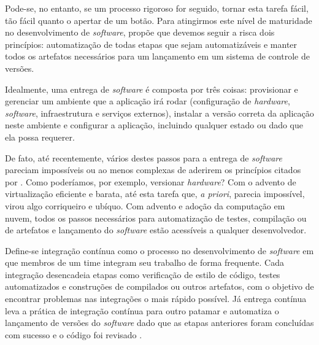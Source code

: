   Pode-se, no entanto, se um processo rigoroso for seguido,  
  tornar esta tarefa fácil, tão fácil quanto o apertar de um botão.
  Para atingirmos este nível de maturidade no desenvolvimento de 
  \emph{software},  propõe que
  devemos seguir a risca dois princípios: automatização de todas etapas que sejam 
  automatizáveis e manter todos os artefatos necessários para um lançamento em um sistema de 
  controle de versões. 

  Idealmente, uma entrega de \emph{software} é composta por três coisas: 
  provisionar e gerenciar um ambiente que a aplicação irá rodar (configuração de \emph{hardware},
  \emph{software}, infraestrutura e serviços externos), instalar a versão correta da aplicação 
  neste ambiente e configurar a aplicação, incluindo qualquer estado ou dado que ela possa requerer.

  De fato, até recentemente, vários destes passos para a entrega de \emph{software} pareciam 
  impossíveis ou ao menos complexas de aderirem os princípios citados por 
  . Como poderíamos, por exemplo, 
  versionar \emph{hardware}? Com o advento de virtualização eficiente e barata, até esta 
  tarefa que, \emph{a priori}, parecia impossível, virou algo corriqueiro e ubíquo. 
  Com advento e adoção da computação em nuvem, todos os passos necessários para automatização 
  de testes, compilação ou de artefatos e lançamento do \emph{software} estão 
  acessíveis a qualquer desenvolvedor.

  Define-se integração contínua como o processo no desenvolvimento de \emph{software} em que 
  membros de um time integram seu trabalho de forma frequente. Cada integração desencadeia etapas 
  como verificação de estilo de código, testes automatizados e construções de compilados ou 
  outros artefatos, com o objetivo de encontrar problemas nas integrações o mais rápido possível.
  Já entrega contínua leva a prática de integração contínua para outro patamar e automatiza 
  o lançamento de versões do \emph{software} dado que as etapas anteriores foram concluídas com 
  sucesso e o código foi revisado \cite{fowler2006continuous}.
